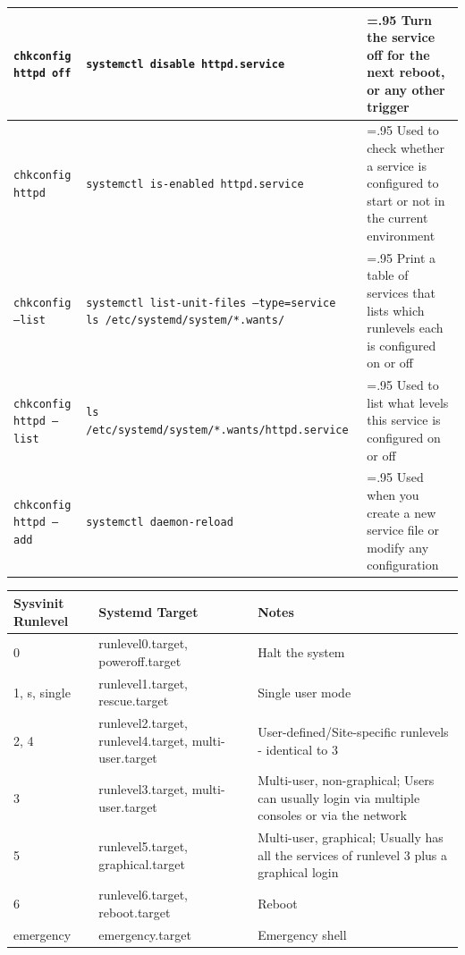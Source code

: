\documentclass[a4paper]{article}
\begin{document}
\begin{center}
\begin{tabularx}{\textwidth}{ |l|>{\hsize=1.05\hsize}X|>{\hsize=.95\hsize}X| }
\tt chkconfig httpd off       & \tt systemctl disable httpd.service                                                   & Turn the service off for the next reboot, or any other trigger \\\hline
\tt chkconfig httpd           & \tt systemctl is-enabled httpd.service                                                & Used to check whether a service is configured to start or not in the current environment \\\hline
\tt chkconfig --list          & \tt systemctl list-unit-files --type=service \newline ls /etc/systemd/system/*.wants/ & Print a table of services that lists which runlevels each is configured on or off \\\hline
\tt chkconfig httpd --list    & \tt ls /etc/systemd/system/*.wants/httpd.service                                      & Used to list what levels this service is configured on or off \\\hline
\tt chkconfig httpd --add     & \tt systemctl daemon-reload                                                           & Used when you create a new service file or modify any configuration \\\hline
\end{tabularx}

\vspace{6mm}

\begin{tabularx}{\textwidth}{ |l|l|X| }
\hline
\rowcolor[gray]{.8}
\bfseries Sysvinit Runlevel & \bfseries Systemd Target                              & \bfseries Notes \\\hline
0                           & runlevel0.target, poweroff.target                     & Halt the system \\\hline
1, s, single                & runlevel1.target, rescue.target                       & Single user mode \\\hline
2, 4                        & runlevel2.target, runlevel4.target, multi-user.target & User-defined/Site-specific runlevels - identical to 3 \\\hline
3                           & runlevel3.target, multi-user.target                   & Multi-user, non-graphical; Users can usually login via multiple consoles or via the network \\\hline
5                           & runlevel5.target, graphical.target                    & Multi-user, graphical; Usually has all the services of runlevel 3 plus a graphical login \\\hline
6                           & runlevel6.target, reboot.target                       & Reboot \\\hline
emergency                   & emergency.target                                      & Emergency shell \\\hline
\end{tabularx}


\end{center}
\end{document}
